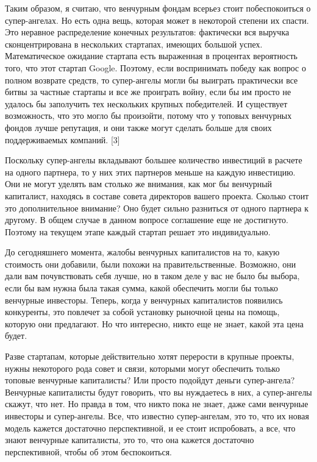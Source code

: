 \documentclass[ebook,12pt,oneside,openany]{memoir}
\begin{document}
Таким образом, я считаю, что венчурным фондам всерьез стоит
побеспокоиться о супер-ангелах. Но есть одна вещь, которая может в
некоторой степени их спасти. Это неравное распределение конечных
результатов: фактически вся выручка сконцентрирована в нескольких
стартапах, имеющих большой успех. Математическое ожидание стартапа
есть выраженная в процентах вероятность того, что этот стартап Google.
Поэтому, если воспринимать победу как вопрос о полном возврате
средств, то супер-ангелы могли бы выиграть практически все битвы за
частные стартапы и все же проиграть войну, если бы им просто не
удалось бы заполучить тех нескольких крупных победителей. И существует
возможность, что это могло бы произойти, потому что у топовых
венчурных фондов лучше репутация, и они также могут сделать больше для
своих поддерживаемых компаний. [3]

Поскольку супер-ангелы вкладывают большее количество инвестиций в
расчете на одного партнера, то у них этих партнеров меньше на каждую
инвестицию. Они не могут уделять вам столько же внимания, как мог бы
венчурный капиталист, находясь в составе совета директоров вашего
проекта. Сколько стоит это дополнительное внимание? Оно будет сильно
разниться от одного партнера к другому. В общем случае в данном
вопросе соглашение еще не достигнуто. Поэтому на текущем этапе каждый
стартап решает это индивидуально.

До сегодняшнего момента, жалобы венчурных капиталистов на то, какую
стоимость они добавили, были похожи на правительственные. Возможно,
они дали вам почувствовать себя лучше, но в таком деле у вас не было
бы выбора, если бы вам нужна была такая сумма, какой обеспечить могли
бы только венчурные инвесторы. Теперь, когда у венчурных капиталистов
появились конкуренты, это повлечет за собой установку рыночной цены на
помощь, которую они предлагают. Но что интересно, никто еще не знает,
какой эта цена будет.

Разве стартапам, которые действительно хотят перерости в крупные
проекты, нужны некоторого рода совет и связи, которыми могут
обеспечить только топовые венчурные капиталисты? Или просто подойдут
деньги супер-ангела? Венчурные капиталисты будут говорить, что вы
нуждаетесь в них, а супер-ангелы скажут, что нет. Но правда в том, что
никто пока не знает, даже сами венчурные инвесторы и супер-ангелы.
Все, что известно супер-ангелам, это то, что их новая модель кажется
достаточно перспективной, и ее стоит испробовать, а все, что знают
венчурные капиталисты, это то, что она кажется достаточно
перспективной, чтобы об этом беспокоиться.
\end{document}
